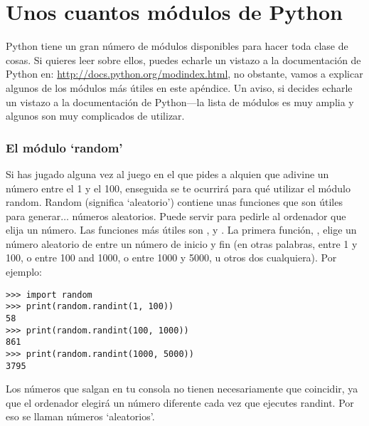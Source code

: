 

\chapter{Unos cuantos módulos de Python}\label{app:afewpythonmodules}

Python tiene un gran número de módulos disponibles para hacer toda clase de cosas.   Si quieres leer sobre ellos, puedes echarle un vistazo a la documentación de Python en: \href{http://docs.python.org/modindex.html}{http://docs.python.org/modindex.html}, no obstante, vamos a explicar algunos de los módulos más útiles en este apéndice.   Un aviso, si decides echarle un vistazo a la documentación de Python---la lista de módulos es muy amplia y algunos son muy complicados de utilizar.

\subsection*{El módulo `random'}

Si has jugado alguna vez al juego en el que pides a alquien que adivine un número entre el 1 y el 100, enseguida se te ocurrirá para qué utilizar el módulo random.   Random (significa `aleatorio') contiene unas funciones que son útiles para generar$\ldots$ números aleatorios. Puede servir para pedirle al ordenador que elija un número.   Las funciones más útiles son ,  y . La primera función, ,  elige un número aleatorio de entre un número de inicio y fin (en otras palabras, entre 1 y 100, o entre 100 and 1000, o entre 1000 y 5000, u otros dos cualquiera).  Por ejemplo:

\begin{listingignore}
\begin{verbatim}
>>> import random
>>> print(random.randint(1, 100))
58
>>> print(random.randint(100, 1000))
861
>>> print(random.randint(1000, 5000))
3795
\end{verbatim}
\end{listingignore}

Los números que salgan en tu consola no tienen necesariamente que coincidir, ya que el ordenador elegirá un número diferente cada vez que ejecutes randint. Por eso se llaman números `aleatorios'.

